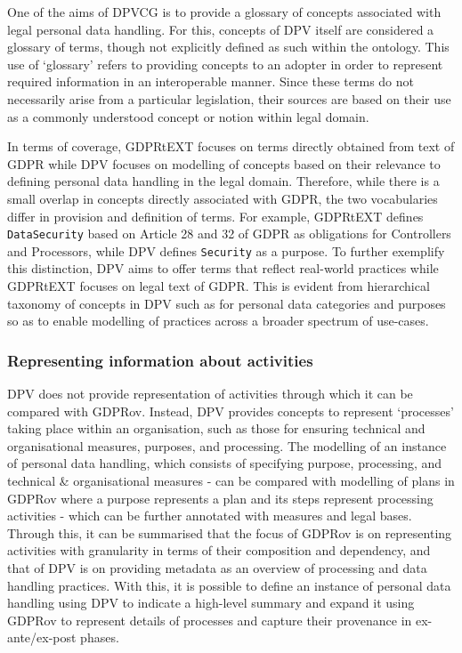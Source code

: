 One of the aims of DPVCG is to provide a glossary of concepts associated with legal personal data handling. For this, concepts of DPV itself are considered a glossary of terms, though not explicitly defined as such within the ontology. This use of `glossary' refers to providing concepts to an adopter in order to represent required information in an interoperable manner. Since these terms do not necessarily arise from a particular legislation, their sources are based on their use as a commonly understood concept or notion within legal domain.

In terms of coverage, GDPRtEXT focuses on terms directly obtained from text of GDPR while DPV focuses on modelling of concepts based on their relevance to defining personal data handling in the legal domain.
Therefore, while there is a small overlap in concepts directly associated with GDPR, the two vocabularies differ in provision and definition of terms. For example, GDPRtEXT defines \texttt{DataSecurity} based on Article 28 and 32 of GDPR as obligations for Controllers and Processors, while DPV defines \texttt{Security} as a purpose. To further exemplify this distinction, DPV aims to offer terms that reflect real-world practices while GDPRtEXT focuses on legal text of GDPR. This is evident from hierarchical taxonomy of concepts in DPV such as for personal data categories and purposes so as to enable modelling of practices across a broader spectrum of use-cases.

\subsubsection{Representing information about activities}
DPV does not provide representation of activities through which it can be compared with GDPRov.
Instead, DPV provides concepts to represent `processes' taking place within an organisation, such as those for ensuring technical and organisational measures, purposes, and processing.
The modelling of an instance of personal data handling, which consists of specifying purpose, processing, and technical \& organisational measures - can be compared with modelling of plans in GDPRov where a purpose represents a plan and its steps represent processing activities - which can be further annotated with measures and legal bases.
Through this, it can be summarised that the focus of GDPRov is on representing activities with granularity in terms of their composition and dependency, and that of DPV is on providing metadata as an overview of  processing and data handling practices. With this, it is possible to define an instance of personal data handling using DPV to indicate a high-level summary and expand it using GDPRov to represent details of processes and capture their provenance in ex-ante/ex-post phases.


